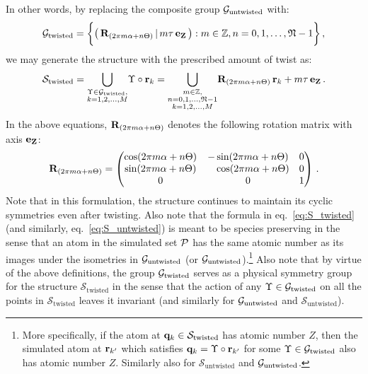 \documentclass[preprint,12pt, 3p, sort&compress]{elsarticle}
\begin{document}
In other words, by replacing the composite group ${\cal G}_{\text{untwisted}}$ with:
\begin{align}
{\cal G}_{\text{twisted}} = \bigg\{\big(\,{{{\bf R}}}_{(2\pi m\alpha + n\Theta)} \,|\,m\tau\,{\bf e}_{{\bf Z}}\,\big) : m \in \mathbb{Z}, n=0,1,\ldots,\mathfrak{N}-1\bigg\}\,,
\end{align}
we may generate the structure with the prescribed amount of twist as:
\begin{align}
\mathcal{S}_{\text{twisted}} =\bigcup_{\substack{{\Upsilon} \in {\cal G}_{\text{twisted}},\\  k = 1,2,\ldots,M }}\!{\Upsilon} \circ {\bf r}_k =  \bigcup_{\substack{m \in \mathbb{Z},\\  n=0,1,\ldots,\mathfrak{N}-1 \\ k = 1,2, \ldots, M}}\!{{\bf R}}_{(2\pi m\alpha+ n\Theta)}\,{\bf r}_k + m\tau\,{\bf e}_{{\bf Z}}\,.
\label{eq:S_twisted}
\end{align}
In the above equations, ${\bf R}_{(2\pi m\alpha + n\Theta)}$ denotes the following rotation matrix with axis ${\bf e}_{{\bf Z}}$: 
\begin{align}
{{\bf R}_{(2\pi m\alpha + n\Theta)}} = 
\begin{pmatrix}
\cos (2\pi m\alpha  + n\Theta)  & -\sin (2\pi m\alpha + n\Theta )  & 0 \\
\sin (2\pi m\alpha + n\Theta)  & \quad\cos (2\pi m\alpha + n\Theta)  & 0 \\
0 & 0 & 1
\end{pmatrix}\,.
\end{align}
Note that in this formulation, the structure continues to maintain its cyclic symmetries even after twisting. Also note that the formula in eq.~\ref{eq:S_twisted} (and similarly, eq.~\ref{eq:S_untwisted}) is meant to be species preserving in the sense that an atom in the simulated set ${\cal P}$ has the same atomic number as its images under the isometries in ${\cal G}_{\text{untwisted}}$ (or ${\cal G}_{\text{untwisted}}$).\footnote{More specifically, if the atom at ${\bf q}_k \in \mathcal{S}_{\text{twisted}}$ has atomic number $Z$, then the simulated atom at ${\bf r}_{k'}$ which satisfies ${\bf q}_k =  \Upsilon \circ {\bf r}_{k'}$ for some $\Upsilon \in {\cal G}_{\text{twisted}}$ also has atomic number $Z$. Similarly also for $\mathcal{S}_{\text{untwisted}}$ and ${\cal G}_{\text{untwisted}}$.} Also note that by virtue of the above definitions, the group ${\cal G}_{\text{twisted}}$ serves as a physical symmetry group for the structure $\mathcal{S}_{\text{twisted}}$ in the sense that the action of any $\Upsilon \in  {\cal G}_{\text{twisted}}$ on all the points in $\mathcal{S}_{\text{twisted}}$ leaves it invariant (and similarly for ${\cal G}_{\text{untwisted}}$  and $\mathcal{S}_{\text{untwisted}}$).
\end{document}
